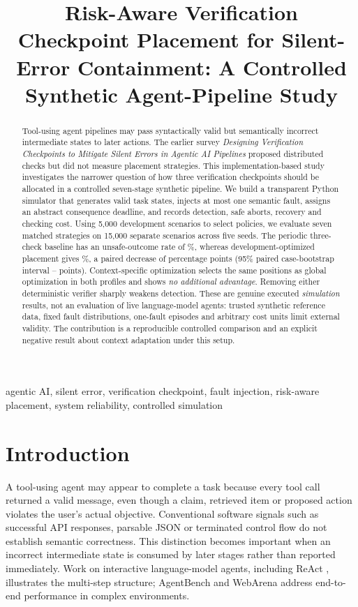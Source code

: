 \documentclass[conference]{IEEEtran}
\title{Risk-Aware Verification Checkpoint Placement for Silent-Error Containment: A Controlled Synthetic Agent-Pipeline Study}
\author{\IEEEauthorblockN{Kratik Agrawal}
\IEEEauthorblockA{MCL2026004\\AI Tools for Research\\India}}
\begin{document}
\maketitle
\begin{abstract}
Tool-using agent pipelines may pass syntactically valid but semantically incorrect intermediate states to later actions. The earlier survey \emph{Designing Verification Checkpoints to Mitigate Silent Errors in Agentic AI Pipelines} proposed distributed checks but did not measure placement strategies. This implementation-based study investigates the narrower question of how three verification checkpoints should be allocated in a controlled seven-stage synthetic pipeline. We build a transparent Python simulator that generates valid task states, injects at most one semantic fault, assigns an abstract consequence deadline, and records detection, safe aborts, recovery and checking cost. Using 5,000 development scenarios to select policies, we evaluate seven matched strategies on 15,000 separate scenarios across five seeds. The periodic three-check baseline has an unsafe-outcome rate of \resPeriodicUnsafe\%, whereas development-optimized placement gives \resGlobalRiskUnsafe\%, a paired decrease of \resPairedDelta{} percentage points (95\% paired case-bootstrap interval \resPairedLo--\resPairedHi{} points). Context-specific optimization selects the same positions as global optimization in both profiles and shows \emph{no additional advantage}. Removing either deterministic verifier sharply weakens detection. These are genuine executed \emph{simulation} results, not an evaluation of live language-model agents: trusted synthetic reference data, fixed fault distributions, one-fault episodes and arbitrary cost units limit external validity. The contribution is a reproducible controlled comparison and an explicit negative result about context adaptation under this setup.
\end{abstract}
\begin{IEEEkeywords}
agentic AI, silent error, verification checkpoint, fault injection, risk-aware placement, system reliability, controlled simulation
\end{IEEEkeywords}

\section{Introduction}
A tool-using agent may appear to complete a task because every tool call returned a valid message, even though a claim, retrieved item or proposed action violates the user's actual objective. Conventional software signals such as successful API responses, parsable JSON or terminated control flow do not establish semantic correctness. This distinction becomes important when an incorrect intermediate state is consumed by later stages rather than reported immediately. Work on interactive language-model agents, including ReAct \cite{yao2023react}, illustrates the multi-step structure; AgentBench and WebArena \cite{liu2024agentbench,zhou2024webarena} address end-to-end performance in complex environments.
\end{document}
